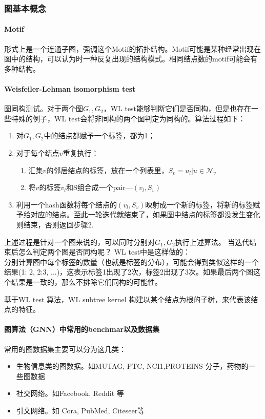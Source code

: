 \subsubsection{图基本概念}
\paragraph{Motif} 形式上是一个连通子图，强调这个Motif的拓扑结构。Motif可能是某种经常出现在图中的结构，可以认为时一种反复出现的结构模式。相同结点数的motif可能会有多种结构。

\paragraph{Weisfeiler-Lehman isomorphism test}  图同构测试。对于两个图$G_1, G_2$，WL test能够判断它们是否同构，但是也存在一些特殊的例子，WL test会将非同构的两个图判定为同构的。算法过程如下：
\begin{enumerate}
	\item 对$G_1, G_2$中的结点都赋予一个标签，都为1；
	\item 对于每个结点$v$重复执行：
	\begin{enumerate}
		\item 汇集$v$的邻居结点的标签，放在一个列表里，$S_v = {u_l | u \in \mathcal{N}_v }$
		\item 将$v$的标签$v_l$和S组合成一个pair---$(v_l, S_v)$
	\end{enumerate}
	\item 利用一个hash函数将每个结点的$(v_l, S_v)$映射成一个新的标签，将新的标签赋予给对应的结点。至此一轮迭代就结束了，如果图中结点的标签都没发生变化则结束，否则返回步骤2.
\end{enumerate}
上述过程是针对一个图来说的，可以同时分别对$G_1, G_2$执行上述算法。
当迭代结束后怎么判定两个图是否同构呢？
WL test中是这样做的：\\
分别计算图中每个标签的数量（也就是标签的分布），可能会得到类似这样的一个结果(1: 2, 2:3, ...)，这表示标签1出现了2次，标签2出现了3次。如果最后两个图这个结果是一致的，那么不排除它们同构的可能性。

基于WL test 算法，WL subtree kernel\cite{shervashidze2011weisfeiler} 构建以某个结点为根的子树，来代表该结点的特征。

\paragraph{图算法（GNN）中常用的benchmar以及数据集} 常用的图数据集主要可以分为这几类：
\begin{itemize}
	\item 生物信息类的图数据。如MUTAG, PTC, NCI1,PROTEINS 分子，药物的一些图数据
	\item 社交网络。如Facebook, Reddit 等
	\item 引文网络。如 Cora, PubMed, Citeseer等
\end{itemize}

